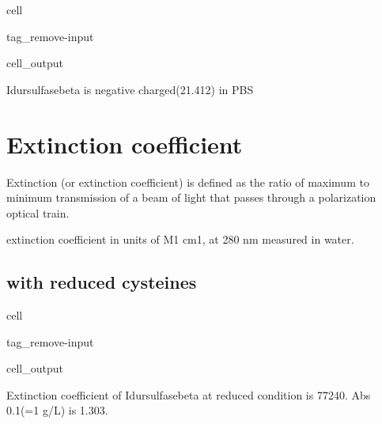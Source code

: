 \documentclass[letterpaper,10pt,english]{jupyterBook}
\begin{document}
\begin{sphinxuseclass}{cell}
\begin{sphinxuseclass}{tag_remove-input}\begin{sphinxVerbatimOutput}

\begin{sphinxuseclass}{cell_output}
\begin{sphinxVerbatim}[commandchars=\\\{\}]
Idursulfasebeta is negative charged(\PYGZhy{}21.412) in PBS
\end{sphinxVerbatim}

\end{sphinxuseclass}\end{sphinxVerbatimOutput}

\end{sphinxuseclass}
\end{sphinxuseclass}

\section{Extinction coefficient}
\label{\detokenize{ipynb/chapter1:extinction-coefficient}}
\sphinxAtStartPar
Extinction (or extinction coefficient) is defined as the ratio of maximum to minimum transmission of a beam of light that passes through a polarization optical train.

\sphinxAtStartPar
extinction coefficient in units of  M\sphinxhyphen{}1 cm\sphinxhyphen{}1, at 280 nm measured in water.


\subsection{with reduced cysteines}
\label{\detokenize{ipynb/chapter1:with-reduced-cysteines}}
\begin{sphinxuseclass}{cell}
\begin{sphinxuseclass}{tag_remove-input}\begin{sphinxVerbatimOutput}

\begin{sphinxuseclass}{cell_output}
\begin{sphinxVerbatim}[commandchars=\\\{\}]
Extinction coefficient of Idursulfasebeta at reduced condition is 77240.
Abs 0.1\PYGZpc{}(=1 g/L) is 1.303.
\end{sphinxVerbatim}

\end{sphinxuseclass}\end{sphinxVerbatimOutput}

\end{sphinxuseclass}
\end{sphinxuseclass}
\end{document}
